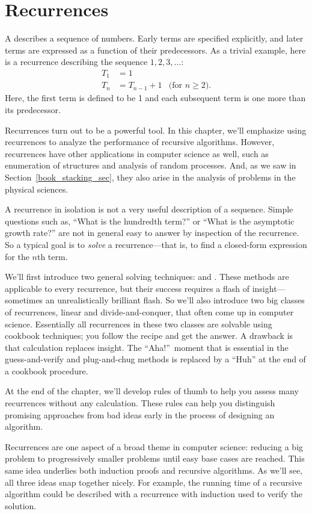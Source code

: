 \part{Recurrences}\label{part:recurrences}

\partintro
{}

A  describes a sequence of numbers.  Early terms are
specified explicitly, and later terms are expressed as a function of
their predecessors.  As a trivial example, here is a recurrence describing
the sequence $1, 2, 3,\dots$:
\begin{align*}
T_1 & = 1 \\
T_n & = T_{n-1} + 1 & \text{(for $n \geq 2$)}.
\end{align*}
Here, the first term is defined to be 1 and each subsequent term is
one more than its predecessor.

Recurrences turn out to be a powerful tool.  In this chapter, we'll
emphasize using recurrences to analyze the performance of recursive
algorithms.  However, recurrences have other applications in computer
science as well, such as enumeration of structures and analysis of
random processes.  And, as we saw in Section~\ref{book_stacking_sec},
they also arise in the analysis of problems in the physical sciences.

A recurrence in isolation is not a very useful description of a
sequence.  Simple questions such as, ``What is the hundredth term?''
or ``What is the asymptotic growth rate?''  are not in general easy to
answer by inspection of the recurrence.  So a typical goal is to
\emph{solve} a recurrence---that is, to find a closed-form expression
for the $n$th term.

We'll first introduce two general solving techniques:
 and .  These methods are
applicable to every recurrence, but their success requires a flash of
insight---sometimes an unrealistically brilliant flash.  So we'll
also introduce two big classes of recurrences, linear and
divide-and-conquer, that often come up in computer science.
Essentially all recurrences in these two classes are solvable using
cookbook techniques; you follow the recipe and get the answer.  A
drawback is that calculation replaces insight.  The ``Aha!''\ moment
that is essential in the guess-and-verify and plug-and-chug methods is
replaced by a ``Huh'' at the end of a cookbook procedure.

At the end of the chapter, we'll develop rules of thumb to help you
assess many recurrences without any calculation.  These rules can help
you distinguish promising approaches from bad ideas early in the
process of designing an algorithm.

Recurrences are one aspect of a broad theme in computer science:
reducing a big problem to progressively smaller problems until easy
base cases are reached.  This same idea underlies both induction
proofs and recursive algorithms.  As we'll see, all three ideas snap
together nicely.  For example, the running time of a recursive
algorithm could be described with a recurrence with induction used to
verify the solution.

\endinput

